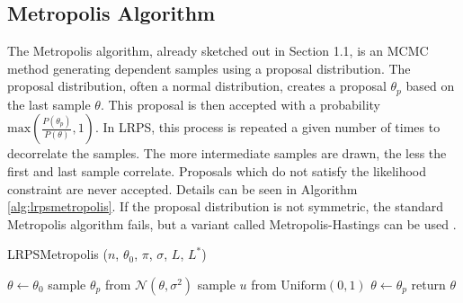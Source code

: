 \documentclass[12pt, a4paper]{report}
\begin{document}
\subsection{Metropolis Algorithm}
The Metropolis algorithm, already sketched out in Section 1.1, is an MCMC method generating dependent samples using a proposal distribution.
The proposal distribution, often a normal distribution, creates a proposal $\theta_p$ based on the last sample $\theta$.
This proposal is then accepted with a probability $\textrm{max}\left(\frac{P(\theta_p)}{P(\theta)}, 1\right)$.
In LRPS, this process is repeated a given number of times to decorrelate the samples.
The more intermediate samples are drawn, the less the first and last sample correlate.
Proposals which do not satisfy the likelihood constraint are never accepted.
Details can be seen in Algorithm \ref{alg:lrpsmetropolis}.
If the proposal distribution is not symmetric, the standard Metropolis algorithm fails, but a variant called Metropolis-Hastings can be used \cite[p. 365f.]{mckay}.
\begin{algorithm}
    \caption[Likelihood-restricted prior sampling using Metropolis.]{LRPSMetropolis ($n$, $\theta_0$, $\pi$, $\sigma$, $L$, $L^*$)}
    \label{alg:lrpsmetropolis}
    \begin{algorithmic}
        \State $\theta \gets \theta_0$
            \State sample $\theta_p$ from $\mathcal{N}(\theta, \sigma^2)$
            \State sample $u$ from $\textrm{Uniform}(0, 1)$
                \State $\theta \gets \theta_p$
            \EndIf
        \EndFor
        \State return $\theta$
    \end{algorithmic}
\end{algorithm}
\end{document}
